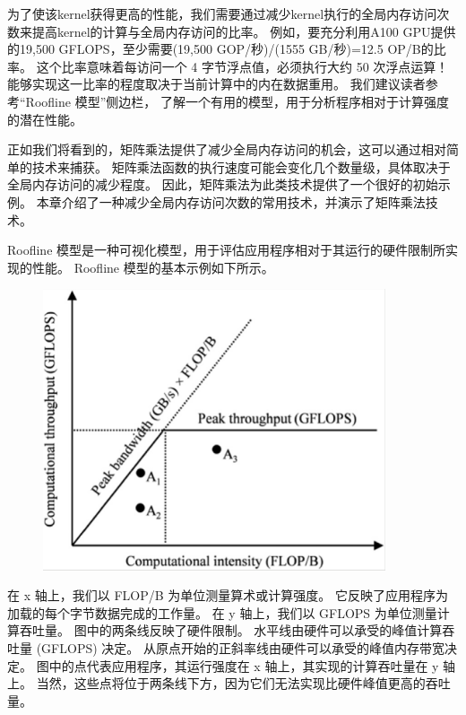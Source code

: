 为了使该kernel获得更高的性能，我们需要通过减少kernel执行的全局内存访问次数来提高kernel的计算与全局内存访问的比率。 
例如，要充分利用A100 GPU提供的19,500 GFLOPS，至少需要(19,500 GOP/秒)/(1555 GB/秒)=12.5 OP/B的比率。 
这个比率意味着每访问一个 4 字节浮点值，必须执行大约 50 次浮点运算！ 
能够实现这一比率的程度取决于当前计算中的内在数据重用。 我们建议读者参考“Roofline 模型”侧边栏，
了解一个有用的模型，用于分析程序相对于计算强度的潜在性能。

正如我们将看到的，矩阵乘法提供了减少全局内存访问的机会，这可以通过相对简单的技术来捕获。 
矩阵乘法函数的执行速度可能会变化几个数量级，具体取决于全局内存访问的减少程度。 
因此，矩阵乘法为此类技术提供了一个很好的初始示例。 本章介绍了一种减少全局内存访问次数的常用技术，并演示了矩阵乘法技术。

\begin{remark}[Roofline 模型]
Roofline 模型是一种可视化模型，用于评估应用程序相对于其运行的硬件限制所实现的性能。 
Roofline 模型的基本示例如下所示。

\begin{figure}[H]
	\centering
	\includegraphics[width=0.9\textwidth]{figs/F5-a.1.png}
\end{figure}

在 x 轴上，我们以 FLOP/B 为单位测量算术或计算强度。 它反映了应用程序为加载的每个字节数据完成的工作量。 
在 y 轴上，我们以 GFLOPS 为单位测量计算吞吐量。 图中的两条线反映了硬件限制。 
水平线由硬件可以承受的峰值计算吞吐量 (GFLOPS) 决定。 从原点开始的正斜率线由硬件可以承受的峰值内存带宽决定。 
图中的点代表应用程序，其运行强度在 x 轴上，其实现的计算吞吐量在 y 轴上。 
当然，这些点将位于两条线下方，因为它们无法实现比硬件峰值更高的吞吐量。


\end{remark}
